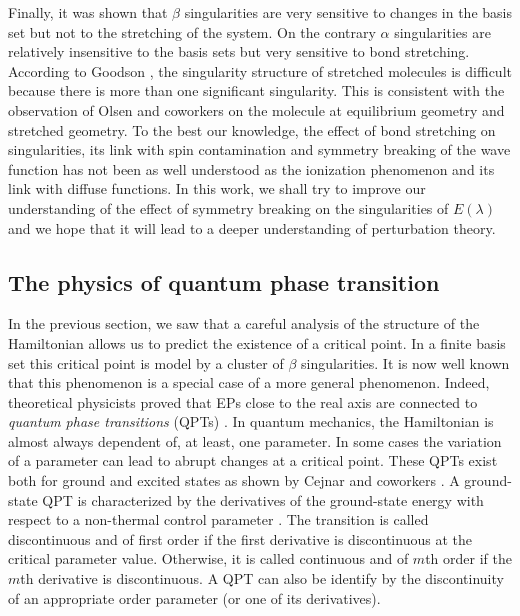 \documentclass[11pt,a4paper]{article}
\begin{document}
Finally, it was shown that $\beta$ singularities are very sensitive to changes in the basis set but not to the stretching of the system. On the contrary $\alpha$ singularities are relatively insensitive to the basis sets but very sensitive to bond stretching. According to Goodson \cite{Goodson_2004}, the singularity structure of stretched molecules is difficult because there is more than one significant singularity. This is consistent with the observation of Olsen and coworkers \cite{Olsen_2000} on the  molecule at equilibrium geometry and stretched geometry. To the best our knowledge, the effect of bond stretching on singularities, its link with spin contamination and symmetry breaking of the wave function has not been as well understood as the ionization phenomenon and its link with diffuse functions.  In this work, we shall try to improve our understanding of the effect of symmetry breaking on the singularities of $E(\lambda)$ and we hope that it will lead to a deeper understanding of perturbation theory.

\subsection{The physics of quantum phase transition}

In the previous section, we saw that a careful analysis of the structure of the Hamiltonian allows us to predict the existence of a critical point. In a finite basis set this critical point is model by a cluster of $\beta$ singularities. It is now well known that this phenomenon is a special case of a more general phenomenon. Indeed, theoretical physicists proved that EPs close to the real axis are connected to \textit{quantum phase transitions} (QPTs) \cite{Heiss_1988, Heiss_2002, Cejnar_2005, Cejnar_2007, Cejnar_2009, Borisov_2015, Sindelka_2017}. In quantum mechanics, the Hamiltonian is almost always dependent of, at least, one parameter. In some cases the variation of a parameter can lead to abrupt changes at a critical point. These QPTs exist both for ground and excited states as shown by Cejnar and coworkers \cite{Cejnar_2009, Sachdev_2011, Cejnar_2015, Cejnar_2016, Caprio_2008, Macek_2019}. A ground-state QPT is characterized by the derivatives of the ground-state energy with respect to a non-thermal control parameter \cite{Cejnar_2009, Sachdev_2011}. The transition is called discontinuous and of first order if the first derivative is discontinuous at the critical parameter value. Otherwise, it is called continuous and of $m$th order if the $m$th derivative is discontinuous. A QPT can also be identify by the discontinuity of an appropriate order parameter (or one of its derivatives). 
\end{document}
